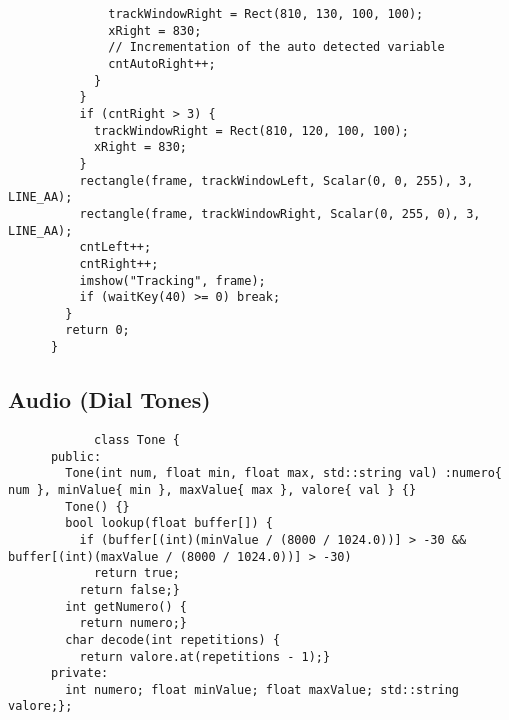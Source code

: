 \documentclass[8pt,a4paper]{article}
\begin{document}
\begin{multicols}{5}
\begin{verbatim}
              trackWindowRight = Rect(810, 130, 100, 100);
              xRight = 830;
              // Incrementation of the auto detected variable
              cntAutoRight++;
            }
          }
          if (cntRight > 3) {
            trackWindowRight = Rect(810, 120, 100, 100);
            xRight = 830;
          }
          rectangle(frame, trackWindowLeft, Scalar(0, 0, 255), 3, LINE_AA);
          rectangle(frame, trackWindowRight, Scalar(0, 255, 0), 3, LINE_AA);
          cntLeft++;
          cntRight++;
          imshow("Tracking", frame);
          if (waitKey(40) >= 0) break;
        }
        return 0;
      }
    \end{verbatim}
    \subsection{Audio (Dial Tones)}
    \begin{verbatim}
            class Tone {
      public:
        Tone(int num, float min, float max, std::string val) :numero{ num }, minValue{ min }, maxValue{ max }, valore{ val } {}
        Tone() {}
        bool lookup(float buffer[]) {
          if (buffer[(int)(minValue / (8000 / 1024.0))] > -30 && buffer[(int)(maxValue / (8000 / 1024.0))] > -30)
            return true;
          return false;}
        int getNumero() {
          return numero;}
        char decode(int repetitions) {
          return valore.at(repetitions - 1);}
      private:
        int numero; float minValue; float maxValue; std::string valore;};


\end{verbatim}
\end{multicols}
\end{document}
